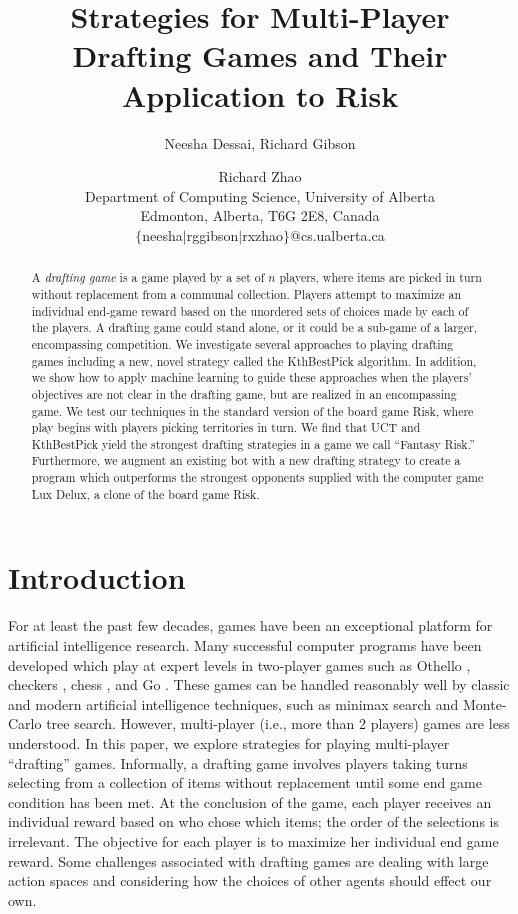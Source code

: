 \documentclass[letterpaper]{article}
\title{Strategies for Multi-Player Drafting Games and Their Application to Risk}
\author{Neesha Dessai, Richard Gibson \and Richard Zhao \\
Department of Computing Science, University of Alberta \\
Edmonton, Alberta, T6G 2E8, Canada \\
$\{$neesha$\mid$rggibson$\mid$rxzhao$\}$@cs.ualberta.ca}
\numberwithin{equation}{section}
\numberwithin{theorem}{section}
\numberwithin{lemma}{section}
\numberwithin{df}{section}
\begin{document}
\maketitle

\begin{abstract}
A \emph{drafting game} is a game played by a set of $n$ players, where items are picked in turn without replacement from a communal collection.  Players attempt to maximize an individual end-game reward based on the unordered sets of choices made by each of the players.  A drafting game could stand alone, or it could be a sub-game of a larger, encompassing competition.  We investigate several approaches to playing drafting games including a new, novel strategy called the KthBestPick algorithm.  In addition, we show how to apply machine learning to guide these approaches when the players' objectives are not clear in the drafting game, but are realized in an encompassing game.  We test our techniques in the standard version of the board game Risk, where play begins with players picking territories in turn.  We find that UCT and KthBestPick yield the strongest drafting strategies in a game we call ``Fantasy Risk.''  Furthermore, we augment an existing bot with a new drafting strategy to create a program which outperforms the strongest opponents supplied with the computer game Lux Delux, a clone of the board game Risk.
\end{abstract}

\section{Introduction}


For at least the past few decades, games have been an exceptional platform for artificial intelligence research.  Many successful computer programs have been developed which play at expert levels in two-player games such as Othello \cite{Othello}, checkers \cite{Chinook}, chess \cite{DeepBlue}, and Go \cite{ComputerGo}.  These games can be handled reasonably well by classic and modern artificial intelligence techniques, such as minimax search and Monte-Carlo tree search.  However, multi-player (i.e., more than 2 players) games are less understood.  In this paper, we explore strategies for playing multi-player ``drafting'' games.  Informally, a drafting game involves players taking turns selecting from a collection of items without replacement until some end game condition has been met.  At the conclusion of the game, each player receives an individual reward based on who chose which items; the order of the selections is irrelevant.  The objective for each player is to maximize her individual end game reward.  Some challenges associated with drafting games are dealing with large action spaces and considering how the choices of other agents should effect our own.
\end{document}
